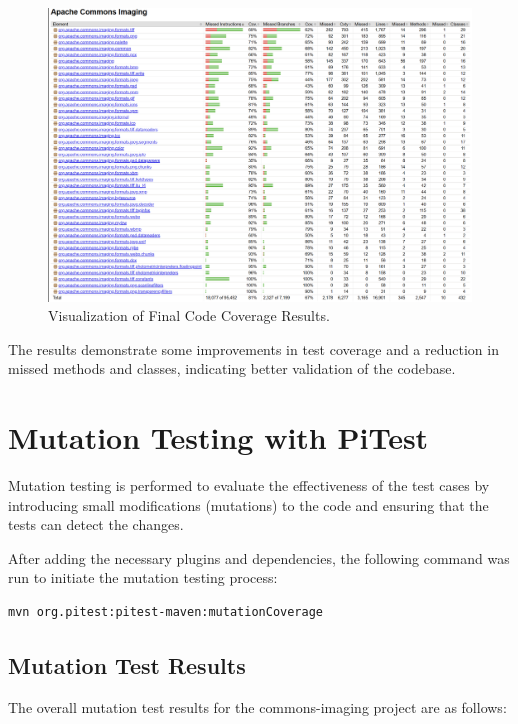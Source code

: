 \documentclass[a4paper,12pt]{report}
\begin{document}
\begin{figure}[H]
    \centering
    \includegraphics[width=1\textwidth]{Report_Img/final_cov.png}
    \caption{Visualization of Final Code Coverage Results.}
    \label{fig:final_coverage_visualization}
\end{figure}

\noindent The results demonstrate some improvements in test coverage and a reduction in missed methods and classes, indicating better validation of the codebase.

\newpage

\chapter{Mutation Testing with PiTest}
Mutation testing is performed to evaluate the effectiveness of the test cases by introducing small modifications (mutations) to the code and ensuring that the tests can detect the changes.

After adding the necessary plugins and dependencies, the following command was run to initiate the mutation testing process:

\begin{lstlisting}[language=bash, caption=Mutation Testing Command]
mvn org.pitest:pitest-maven:mutationCoverage
\end{lstlisting}

\section{Mutation Test Results}
The overall mutation test results for the commons-imaging project are as follows:
\end{document}

